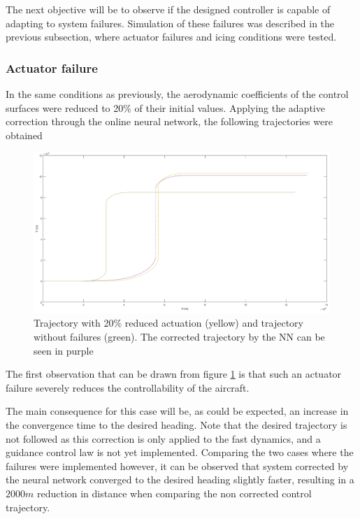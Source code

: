 The next objective will be to observe if the designed controller is capable of adapting to system failures. Simulation of these failures was described in the previous subsection, where actuator failures and icing conditions were tested. 

\subsubsection{Actuator failure}

In the same conditions as previously, the aerodynamic coefficients of the control surfaces were reduced to 20\% of their initial values. Applying the adaptive correction through the online neural network, the following trajectories were obtained

\begin{figure}[H]
\centering
\includegraphics[width=\textwidth]{Figures/Results/reduced_act_NN.png}
\caption[Trajectory with reduced actuation corrected with NN correction]{Trajectory with 20\% reduced actuation (yellow) and trajectory without failures (green). The corrected trajectory by the NN can be seen in purple}
\label{fig:reduced_act_NN}
\end{figure}

The first observation that can be drawn from figure \ref{fig:reduced_act_NN} is that such an actuator failure severely reduces the controllability of the aircraft. 

The main consequence for this case will be, as could be expected, an increase in the convergence time to the desired heading. Note that the desired trajectory is not followed as this correction is only applied to the fast dynamics, and a guidance control law is not yet implemented. Comparing the two cases where the failures were implemented however, it can be observed that system corrected by the neural network converged to the desired heading slightly faster, resulting in a $2000m$ reduction in distance when comparing the non corrected control trajectory.

